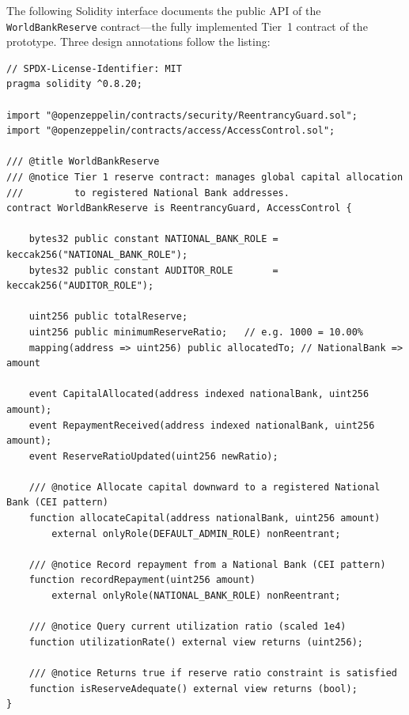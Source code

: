 \documentclass[12pt,a4paper]{report}
\begin{document}
The following Solidity interface documents the public API of the \texttt{WorldBankReserve} contract---the fully implemented Tier~1 contract of the prototype. Three design annotations follow the listing:

\begin{lstlisting}[language=Solidity,basicstyle=\ttfamily\scriptsize,breaklines=true,
    commentstyle=\color{GrayText},keywordstyle=\color{PrimaryBlue}\bfseries,
    frame=single,rulecolor=\color{AccentBlue!40},captionpos=b,
    caption={WorldBankReserve.sol -- Tier 1 public interface. Full implementation in project repository.}]
// SPDX-License-Identifier: MIT
pragma solidity ^0.8.20;

import "@openzeppelin/contracts/security/ReentrancyGuard.sol";
import "@openzeppelin/contracts/access/AccessControl.sol";

/// @title WorldBankReserve
/// @notice Tier 1 reserve contract: manages global capital allocation
///         to registered National Bank addresses.
contract WorldBankReserve is ReentrancyGuard, AccessControl {

    bytes32 public constant NATIONAL_BANK_ROLE = keccak256("NATIONAL_BANK_ROLE");
    bytes32 public constant AUDITOR_ROLE       = keccak256("AUDITOR_ROLE");

    uint256 public totalReserve;
    uint256 public minimumReserveRatio;   // e.g. 1000 = 10.00%
    mapping(address => uint256) public allocatedTo; // NationalBank => amount

    event CapitalAllocated(address indexed nationalBank, uint256 amount);
    event RepaymentReceived(address indexed nationalBank, uint256 amount);
    event ReserveRatioUpdated(uint256 newRatio);

    /// @notice Allocate capital downward to a registered National Bank (CEI pattern)
    function allocateCapital(address nationalBank, uint256 amount)
        external onlyRole(DEFAULT_ADMIN_ROLE) nonReentrant;

    /// @notice Record repayment from a National Bank (CEI pattern)
    function recordRepayment(uint256 amount)
        external onlyRole(NATIONAL_BANK_ROLE) nonReentrant;

    /// @notice Query current utilization ratio (scaled 1e4)
    function utilizationRate() external view returns (uint256);

    /// @notice Returns true if reserve ratio constraint is satisfied
    function isReserveAdequate() external view returns (bool);
}
\end{lstlisting}
\end{document}

